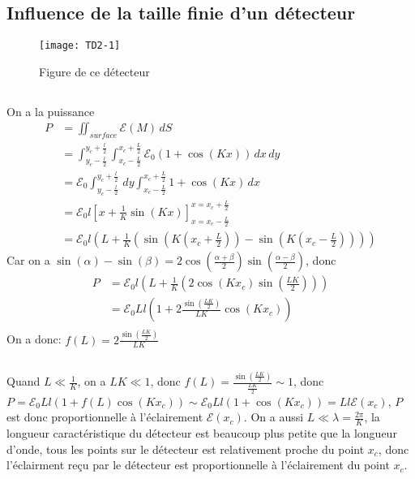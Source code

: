 \documentclass[a4paper,12pt]{book}
\begin{document}
\begin{CJK}{UTF8}{gbsn}
\renewcommand{\labelitemi}{$\blacktriangleright$}
\renewcommand{\labelitemii}{$\bullet$}


\section{Influence de la taille finie d'un détecteur}

\begin{figure}[h]
\begin{center}
\texttt{[image: TD2-1]}
\end{center}
\caption{Figure de ce détecteur}
\end{figure}

\subsection{}
On a la puissance
\begin{align*}
P&=\iint_{surface} \mathcal{E}(M)\,dS \\
 &=\int_{y_c-\frac{l}{2}}^{y_c+\frac{l}{2}}\int_{x_c-\frac{L}{2}}^{x_c+\frac{L}{2}}
 \mathcal{E}_0(1+\cos(Kx))\,dx\,dy\\
 &=\mathcal{E}_0\int_{y_c-\frac{l}{2}}^{y_c+\frac{l}{2}}\,dy\int_{x_c-\frac{L}{2}}^{x_c+\frac{L}{2}}
 1+\cos(Kx)\,dx\\
 &=\mathcal{E}_0l\left[x+\frac{1}{K}\sin(Kx)\right]_{x=x_c-\frac{L}{2}}^{x=x_c+\frac{L}{2}}\\
 &=\mathcal{E}_0l\left(L+\frac{1}{K}(\sin(K(x_c+\frac{L}{2}))-\sin(K(x_c-\frac{L}{2})))\right)
\end{align*}
Car on a $\sin(\alpha)-\sin(\beta)=2\cos(\frac{\alpha+\beta}{2})\sin(\frac{\alpha-\beta}{2})$, donc
\begin{align*}
P&=\mathcal{E}_0l\left(L+\frac{1}{K}(2\cos(Kx_c)\sin(\frac{LK}{2}))\right)\\
 &=\mathcal{E}_0Ll\left(1+2\frac{\sin(\frac{LK}{2})}{LK}\cos(Kx_c)\right)\\
\end{align*}
On a donc: $\boxed{f(L)=2\frac{\sin(\frac{LK}{2})}{LK}}$

\subsection{}
Quand $L\ll\frac{1}{K}$, on a $LK\ll1$, donc $f(L)=\frac{\sin(\frac{LK}{2})}{\frac{LK}{2}}\sim1$, 
donc $P=\mathcal{E}_0Ll\left(1+f(L)\cos(Kx_c)\right) \sim \mathcal{E}_0Ll\left(1+\cos(Kx_c)\right) = 
\boxed{Ll\mathcal{E}(x_c)}$, $P$ est donc proportionnelle à l'éclairement $\mathcal{E}(x_c)$. On a aussi
$L\ll\lambda=\frac{2\pi}{K}$, la longueur caractéristique du détecteur est beaucoup plus petite que la longueur
d'onde, tous les points sur le détecteur est relativement proche du point $x_c$, donc l'éclairment reçu 
par le détecteur est proportionnelle à l'éclairement du point $x_c$. 


\end{CJK}
\end{document}
